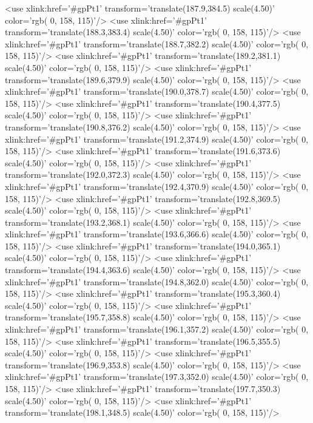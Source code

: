 	<use xlink:href='#gpPt1' transform='translate(187.9,384.5) scale(4.50)' color='rgb(  0, 158, 115)'/>
	<use xlink:href='#gpPt1' transform='translate(188.3,383.4) scale(4.50)' color='rgb(  0, 158, 115)'/>
	<use xlink:href='#gpPt1' transform='translate(188.7,382.2) scale(4.50)' color='rgb(  0, 158, 115)'/>
	<use xlink:href='#gpPt1' transform='translate(189.2,381.1) scale(4.50)' color='rgb(  0, 158, 115)'/>
	<use xlink:href='#gpPt1' transform='translate(189.6,379.9) scale(4.50)' color='rgb(  0, 158, 115)'/>
	<use xlink:href='#gpPt1' transform='translate(190.0,378.7) scale(4.50)' color='rgb(  0, 158, 115)'/>
	<use xlink:href='#gpPt1' transform='translate(190.4,377.5) scale(4.50)' color='rgb(  0, 158, 115)'/>
	<use xlink:href='#gpPt1' transform='translate(190.8,376.2) scale(4.50)' color='rgb(  0, 158, 115)'/>
	<use xlink:href='#gpPt1' transform='translate(191.2,374.9) scale(4.50)' color='rgb(  0, 158, 115)'/>
	<use xlink:href='#gpPt1' transform='translate(191.6,373.6) scale(4.50)' color='rgb(  0, 158, 115)'/>
	<use xlink:href='#gpPt1' transform='translate(192.0,372.3) scale(4.50)' color='rgb(  0, 158, 115)'/>
	<use xlink:href='#gpPt1' transform='translate(192.4,370.9) scale(4.50)' color='rgb(  0, 158, 115)'/>
	<use xlink:href='#gpPt1' transform='translate(192.8,369.5) scale(4.50)' color='rgb(  0, 158, 115)'/>
	<use xlink:href='#gpPt1' transform='translate(193.2,368.1) scale(4.50)' color='rgb(  0, 158, 115)'/>
	<use xlink:href='#gpPt1' transform='translate(193.6,366.6) scale(4.50)' color='rgb(  0, 158, 115)'/>
	<use xlink:href='#gpPt1' transform='translate(194.0,365.1) scale(4.50)' color='rgb(  0, 158, 115)'/>
	<use xlink:href='#gpPt1' transform='translate(194.4,363.6) scale(4.50)' color='rgb(  0, 158, 115)'/>
	<use xlink:href='#gpPt1' transform='translate(194.8,362.0) scale(4.50)' color='rgb(  0, 158, 115)'/>
	<use xlink:href='#gpPt1' transform='translate(195.3,360.4) scale(4.50)' color='rgb(  0, 158, 115)'/>
	<use xlink:href='#gpPt1' transform='translate(195.7,358.8) scale(4.50)' color='rgb(  0, 158, 115)'/>
	<use xlink:href='#gpPt1' transform='translate(196.1,357.2) scale(4.50)' color='rgb(  0, 158, 115)'/>
	<use xlink:href='#gpPt1' transform='translate(196.5,355.5) scale(4.50)' color='rgb(  0, 158, 115)'/>
	<use xlink:href='#gpPt1' transform='translate(196.9,353.8) scale(4.50)' color='rgb(  0, 158, 115)'/>
	<use xlink:href='#gpPt1' transform='translate(197.3,352.0) scale(4.50)' color='rgb(  0, 158, 115)'/>
	<use xlink:href='#gpPt1' transform='translate(197.7,350.3) scale(4.50)' color='rgb(  0, 158, 115)'/>
	<use xlink:href='#gpPt1' transform='translate(198.1,348.5) scale(4.50)' color='rgb(  0, 158, 115)'/>
